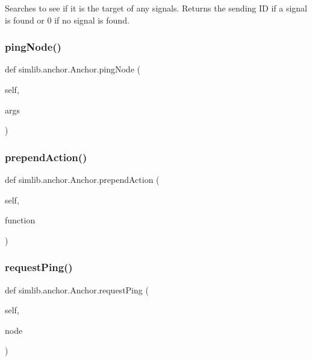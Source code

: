 \begin{DoxyVerb}Searches to see if it is the target of any signals. Returns the sending ID
if a signal is found or 0 if no signal is found.
\end{DoxyVerb}
 \mbox{\label{classsimlib_1_1anchor_1_1_anchor_a7fb5450523f88349670ecaee772996bc}} 
\subsubsection{\texorpdfstring{ping\+Node()}{pingNode()}}
{\footnotesize\ttfamily def simlib.\+anchor.\+Anchor.\+ping\+Node (\begin{DoxyParamCaption}\item[{}]{self,  }\item[{}]{args }\end{DoxyParamCaption})}

\mbox{\label{classsimlib_1_1anchor_1_1_anchor_ad6a0662edca4f31fdb1f2e1ddc3f14f9}} 
\subsubsection{\texorpdfstring{prepend\+Action()}{prependAction()}}
{\footnotesize\ttfamily def simlib.\+anchor.\+Anchor.\+prepend\+Action (\begin{DoxyParamCaption}\item[{}]{self,  }\item[{}]{function }\end{DoxyParamCaption})}

\mbox{\label{classsimlib_1_1anchor_1_1_anchor_a99648f62d73c149e1683b829c3e3763c}} 
\subsubsection{\texorpdfstring{request\+Ping()}{requestPing()}}
{\footnotesize\ttfamily def simlib.\+anchor.\+Anchor.\+request\+Ping (\begin{DoxyParamCaption}\item[{}]{self,  }\item[{}]{node }\end{DoxyParamCaption})}

